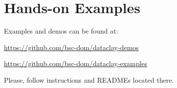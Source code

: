 
\chapter{Hands-on Examples}
\label{sec:FullDemo}

Examples and demos can be found at: 

\href {https://github.com/bsc-dom/dataclay-demos} {https://github.com/bsc-dom/dataclay-demos}

\href {https://github.com/bsc-dom/dataclay-examples} {https://github.com/bsc-dom/dataclay-examples}

Please, follow instructions and READMEs located there. 